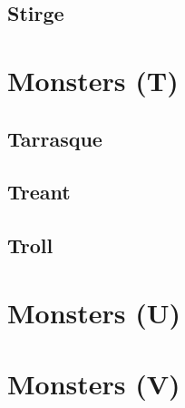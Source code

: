 \subsection{Stirge}



\FloatBarrier
\section{Monsters (T)} \label{sec:monsters-t}
\subsection{Tarrasque}


\subsection{Treant}


\subsection{Troll}

\FloatBarrier
\section{Monsters (U)} \label{sec:monsters-u}

\FloatBarrier
\section{Monsters (V)} \label{sec:monsters-v}
